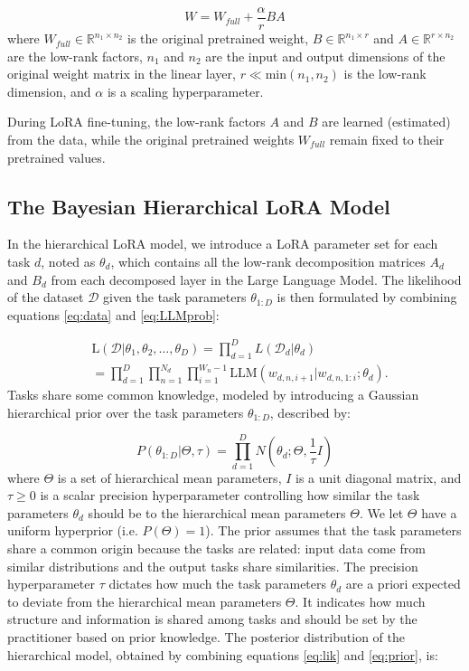 \documentclass[fullpaper]{nldl}
\newcommand{\R}{\mathbb{R}}
\begin{document}
\begin{equation} \label{eq:LoRA}
    W = W_{full} + \frac{\alpha}{r} BA 
\end{equation}
%
where 
$W_{full} \in \R^{n_1 \times n_2}$ is the original pretrained weight, 
$B \in \R^{n_1 \times r}$ and $A \in \R^{r \times n_2}$ are the low-rank factors, 
$n_1$ and $n_2$ are the input and output dimensions of the original weight matrix in the linear layer,
$r \ll \text{min}(n_1, n_2)$ is the low-rank dimension,
and $\alpha$ is a scaling hyperparameter.

During LoRA fine-tuning, the low-rank factors $A$ and $B$ are learned (estimated) from the data, while the original pretrained weights $W_{full}$ remain fixed to their pretrained values.

\subsection{The Bayesian Hierarchical LoRA Model} \label{sec:BoRA}
In the hierarchical LoRA model, we introduce a LoRA parameter set for each task $d$, noted as $\theta_d$, which contains all the low-rank decomposition matrices $A_d$ and $B_d$ from each decomposed layer in the Large Language Model. The likelihood of the dataset $\mathcal{D}$ given the task parameters $\theta_{1:D}$ is then formulated by combining equations \ref{eq:data} and \ref{eq:LLMprob}:

\begin{align}  \label{eq:lik}
    & \text{L}(\mathcal{D} | \theta_1, \theta_2, \ldots, \theta_D) = \prod_{d=1}^D L(\mathcal{D}_d | \theta_d) \nonumber \\
    &= \prod_{d=1}^D \prod_{n=1}^{N_d} \prod_{i=1}^{W_n-1} \text{LLM}(w_{d,n,i+1} | w_{d,n,1:i}; \theta_d).
\end{align}
%
Tasks share some common knowledge, modeled by introducing a Gaussian hierarchical prior over the task parameters $\theta_{1:D}$, described by:

\begin{equation} \label{eq:prior}
    P(\theta_{1:D} | \Theta, \tau) = \prod_{d=1}^D N(\theta_d ; \Theta, \frac{1}{\tau} I)
\end{equation}
where $\Theta$ is a set of hierarchical mean parameters, $I$ is a unit diagonal matrix, and $\tau \geq 0$ is a scalar precision hyperparameter controlling how similar the task parameters $\theta_d$ should be to the hierarchical mean parameters $\Theta$.
We let $\Theta$ have a uniform hyperprior (i.e. $P(\Theta) = 1$). The prior assumes that the task parameters share a common origin because the tasks are related: input data come from similar distributions and the output tasks share similarities. The precision hyperparameter $\tau$ dictates how much the task parameters $\theta_d$ are a priori expected to deviate from the hierarchical mean parameters $\Theta$. It indicates how much structure and information is shared among tasks and should be set by the practitioner based on prior knowledge.
The posterior distribution of the hierarchical model, obtained by combining equations \ref{eq:lik} and \ref{eq:prior}, is:
\end{document}

